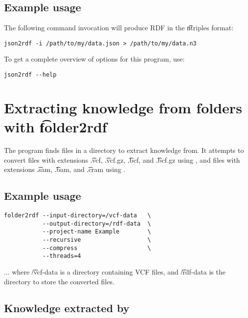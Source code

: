 \subsection{Example usage}

The following command invocation will produce RDF in the \t{ntriples}
format:
\begin{siderules}
\begin{verbatim}
json2rdf -i /path/to/my/data.json > /path/to/my/data.n3
\end{verbatim}
\end{siderules}

To get a complete overview of options for this program, use:
\begin{siderules}
\begin{verbatim}
json2rdf --help
\end{verbatim}
\end{siderules}

\section{Extracting knowledge from folders with \t{folder2rdf}}
\label{sec:folder2rdf}

  The  program finds files in a directory to extract
  knowledge from.  It attempts to convert files with extensions
  \t{.vcf}, \t{.vcf.gz}, \t{.bcf}, and \t{.bcf.gz}
  using , and files with extensions \t{.sam},
  \t{.bam}, and \t{.cram} using .

\subsection{Example usage}

\begin{siderules}
\begin{verbatim}
folder2rdf --input-directory=/vcf-data   \
           --output-directory=/rdf-data  \
           --project-name Example        \
           --recursive                   \
           --compress                    \
           --threads=4
\end{verbatim}
\end{siderules}

  $\ldots{}$ where \t{/vcf-data} is a directory containing VCF files,
  and \t{/rdf-data} is the directory to store the converted files.

\subsection{Knowledge extracted by }

